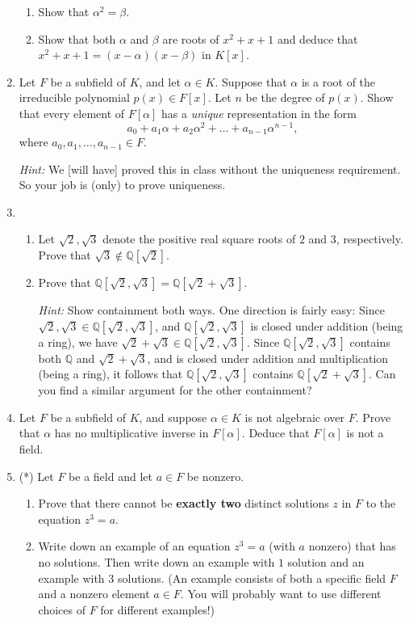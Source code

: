 \documentclass[11pt]{article}
\def\Q{\mathbb{Q}}
\theoremstyle{plain}
\theoremstyle{remark}
\begin{document}
\begin{enumerate}
\begin{enumerate}
\item Show that $\alpha^2=\beta$.
\item Show that both $\alpha$ and $\beta$ are roots of $x^2+x+1$ and deduce that $x^2+x+1 = (x-\alpha)(x-\beta)$ in $K[x]$.
\end{enumerate}

\item Let $F$ be a subfield of $K$, and let $\alpha \in K$. Suppose that $\alpha$ is a root of the irreducible polynomial $p(x) \in F[x]$. Let $n$ be the degree of $p(x)$. Show that every element of $F[\alpha]$ has a \emph{unique} representation in the form
\[ a_0 + a_1 \alpha + a_2 \alpha^2 +\dots+a_{n-1}\alpha^{n-1},\]
where $a_0, a_1, \dots, a_{n-1} \in F$.

{\scriptsize \emph{Hint:} We [will have] proved this in class without the uniqueness requirement. So your job is (only) to prove uniqueness.}

\item 
\begin{enumerate}
\item Let $\sqrt{2}, \sqrt{3}$ denote the positive real square roots of $2$ and $3$, respectively. Prove that $\sqrt{3} \notin \Q[\sqrt{2}]$. 
\item Prove that $\Q[\sqrt{2},\sqrt{3}] = \Q[\sqrt{2}+\sqrt{3}]$.

{\scriptsize \emph{Hint:} Show containment both ways. One direction is fairly easy: Since $\sqrt{2}, \sqrt{3} \in \Q[\sqrt{2},\sqrt{3}]$, and $\Q[\sqrt{2},\sqrt{3}]$ is closed under addition (being a ring), we have $\sqrt{2}+\sqrt{3} \in \Q[\sqrt{2},\sqrt{3}]$. Since $\Q[\sqrt{2},\sqrt{3}]$ contains both $\Q$ and $\sqrt{2}+\sqrt{3}$, and is closed under addition and multiplication (being a ring), it follows that $\Q[\sqrt{2},\sqrt{3}]$ contains $\Q[\sqrt{2}+\sqrt{3}]$. Can you find a similar argument for the other containment?}
\end{enumerate}

\item Let $F$ be a subfield of $K$, and suppose $\alpha \in K$ is not algebraic over $F$. Prove that $\alpha$ has no multiplicative inverse in $F[\alpha]$. Deduce that $F[\alpha]$ is not a field.

\item (*) Let $F$ be a field and let $a\in F$ be nonzero.
\begin{enumerate}
\item Prove that there cannot be \textbf{exactly two} distinct solutions $z$ in $F$ to the equation $z^3=a$. 
\item Write down an example  of an equation $z^3=a$ (with $a$ nonzero) that has no solutions. Then write down an example with $1$ solution and an example with $3$ solutions. (An example consists of both a specific field $F$ and a nonzero element $a\in F$. You will probably want to use different choices of $F$ for different examples!)
\end{enumerate}
\end{enumerate}
\end{document}
